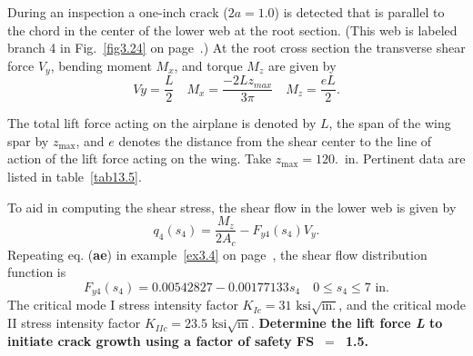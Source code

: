 \documentclass{AeroStructure-ERJohnson}
\begin{document}
\begin{exercise}
\begin{enumerate}[\textbf{2.}]
\noindent During an inspection a one-inch crack ($2a=1.0$) is detected that is parallel to the chord in the center of the lower web at the root section. (This web is labeled branch 4 in Fig.~\ref{fig3.24} on page~\pageref{fig3.24}.) At the root cross section the transverse shear force $V_{y}$, bending moment $M_{x}$, and torque $M_{z}$ are given by
\begin{equation}
V y=\frac{L}{2} \quad M_{x}=\frac{-2 L z_{m a x}}{3 \pi} \quad M_{z}=\frac{e L}{2}. \label{eq13.6.b}\tag{b}
\end{equation}
\vspace*{2pt}\vspace*{-8pt}
\pagebreak

\noindent The total lift force acting on the airplane is denoted by $L$, the span of the wing spar by $z_{\textrm{max}}$, and $e$ denotes the distance from the shear center to the line of action of the lift force acting on the wing. Take $z_{\textrm{max}} = 120$.~in.
Pertinent data are listed in table~\ref{tab13.5}.

\begin{table}[!h]
\vspace*{-1pc}
\end{table}

To aid in computing the shear stress, the shear flow in the lower web is given by
\begin{equation}
q_{4}\left(s_{4}\right)=\frac{M_{z}}{2 A_{c}}-F_{y 4}\left(s_{4}\right) V_{y}. \label{eq13.6.c}\tag{c}
\end{equation}
Repeating eq. (\textbf{ae}) in example~\ref{ex3.4} on page~\pageref{ex3.4}, the shear flow distribution function is
\begin{equation}
F_{y 4}\left(s_{4}\right)=0.00542827-0.00177133 s_{4} \quad 0 \leq s_{4} \leq 7 \textrm{ in}. \label{eq13.6.d}\tag{d}
\end{equation}
The critical mode I stress intensity factor $K_{I c}=31 \textrm{ ksi} \sqrt{\mathrm{in.}}$, and the critical mode II stress intensity factor $K_{I I c}=23.5 \textrm{ ksi} \sqrt{\mathrm{in}}$. \textbf{Determine the lift force \textit{L} to initiate crack growth using a factor of safety FS~$=$~1.5.}


\end{enumerate}
\end{exercise}
\end{document}
